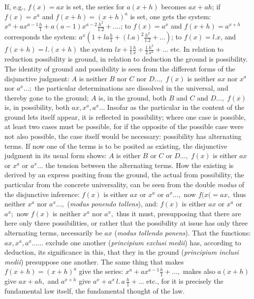 \documentclass[12pt,a4paper,openany]{book}
\newcommand{\opage}[1]{\marginnote{\footnotesize\textit{[#1]}}}
\begin{document}
If, e.g., $f(x)=ax$ is set, the series for $a(x+h)$ becomes $ax+ah$; if $f(x)=x^{a}$ and $f(x+h)=(x+h)^{a}$ is set, one gets the system: $x^{a}+ax^{a-1}\frac{h}{1}+a(a-1)x^{a-2}\frac{h^{2}}{1.2}+\ldots.$; to $f(x)=a^{x}$ and $f(x+h)=a^{x+h}$ corresponds the system: $a^{x}\left(1+la\frac{h}{1}+(l.a)^{2}\frac{h^{2}}{1.2}+\ldots\right)$; to $f(x)=l.x$, and $f(x+h)=l.(x+h)$ the system $lx+\frac{1}{1}\frac{h}{x}\div\frac{1}{2}\frac{h^{2}}{x^{2}}+\ldots$ etc. In relation to reduction possibility is ground, in relation to deduction the ground is possibility. The identity of ground and possibility is seen from the different
\setcounter{footnote}{0}%
\opage{51}forms of the disjunctive judgment: $A$ is neither $B$ nor $C$ nor $D\ldots,$ $f(x)$ is neither $ax$ nor $x^{a}$ nor $a^{x}\ldots;$ the particular determinations are dissolved in the universal, and thereby gone to the ground; $A$ is, in the ground, both $B$ and $C$ and $D\ldots,$ $f(x)$ is, in possibility, both $ax, x^{a}, a^{x}\ldots$ Insofar as the particular in the content of the ground lets itself appear, it is reflected in possibility; where one case is possible, at least two cases must be possible, for if the opposite of the possible case were not also possible, the case itself would be necessary: possibility has alternating terms. If now one of the terms is to be posited as existing, the disjunctive judgment in its usual form shows: $A$ is either $B$ or $C$ or $D\ldots,$ $f(x)$ is either $ax$ or $x^{a}$ or $a^{x}\ldots$ the tension between the alternating terms. How the existing is derived by an express positing from the ground, the actual from possibility, the particular from the concrete universality, can be seen from the double \textit{modus} of the disjunctive inference: $f(x)$ is either $ax$ or $x^{a}$ or $a^{x}\ldots,$ now $f(x(=ax,$ thus neither $x^{a}$ nor %
$a^{x}\ldots,$ (\textit{modus ponendo tollens}), and: $f(x)$ is either $ax$ or
$x^{a}$ or $a^{x};$ now $f(x)$ is neither $x^{a}$ nor $a^{x},$ thus it must, presupposing that there are here only three possibilities, or rather that the possibility at issue has only three alternating terms, necessarily be $ax$ (\textit{modus tollendo
ponens}). That the functions: $ax, x^{a}, a^{x}\ldots\ldots$ exclude one another (\textit{principium exclusi medii}) has, according to deduction, its significance in this, that they in the ground (\textit{principium inclusi medii}) presuppose one another. The same thing that makes $f(x+h)=(x+h)^{a}$ give the series: $x^{a}+ax^{a-1}\frac{h}{1}+\ldots,$ makes also $a(x+h)$ give $ax+ah,$ and $a^{x+h}$ give $a^{x}+a^{x}\,l.\,a\,\frac{h}{1}+\ldots$ etc., for it is precisely the fundamental law itself, the fundamental thought of the law.
\end{document}
